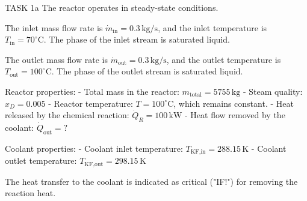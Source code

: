 TASK 1a  
The reactor operates in steady-state conditions.  

The inlet mass flow rate is \( \dot{m}_{\text{in}} = 0.3 \, \text{kg/s} \), and the inlet temperature is \( T_{\text{in}} = 70^\circ\text{C} \). The phase of the inlet stream is saturated liquid.  

The outlet mass flow rate is \( \dot{m}_{\text{out}} = 0.3 \, \text{kg/s} \), and the outlet temperature is \( T_{\text{out}} = 100^\circ\text{C} \). The phase of the outlet stream is saturated liquid.  

Reactor properties:  
- Total mass in the reactor: \( m_{\text{total}} = 5755 \, \text{kg} \)  
- Steam quality: \( x_D = 0.005 \)  
- Reactor temperature: \( T = 100^\circ\text{C} \), which remains constant.  
- Heat released by the chemical reaction: \( \dot{Q}_R = 100 \, \text{kW} \)  
- Heat flow removed by the coolant: \( \dot{Q}_{\text{out}} = ? \)  

Coolant properties:  
- Coolant inlet temperature: \( T_{\text{KF,in}} = 288.15 \, \text{K} \)  
- Coolant outlet temperature: \( T_{\text{KF,out}} = 298.15 \, \text{K} \)  

The heat transfer to the coolant is indicated as critical ("IF!") for removing the reaction heat.
